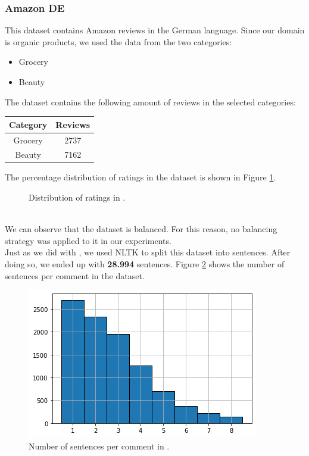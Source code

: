 \subsubsection{Amazon DE}
This dataset contains Amazon reviews in the German language. Since our domain is organic products, we used the data from the two categories:
\begin{itemize}
  \item Grocery
  \item Beauty
\end{itemize}
The dataset contains the following amount of reviews in the selected categories:
\begin{center}
 \begin{tabular}{||c c||} 
 \hline
 Category & Reviews\\ [0.4ex] 
 \hline\hline
 Grocery & 2737\\ 
 \hline
 Beauty & 7162\\
 \hline
\end{tabular}
\end{center}
The percentage distribution of ratings in the dataset is shown in Figure \ref{amazon_de_pie_chart}.\\
\begin{figure}[h]
\centering
{}
\caption{Distribution of ratings in \dataDE.}
\label{amazon_de_pie_chart}
\end{figure}\\
We can observe that the dataset is balanced. For this reason, no balancing strategy was applied to it in our experiments.\\
Just as we did with \dataEN, we used NLTK to split this dataset into sentences. After doing so, we ended up with {\bf 28.994} sentences. Figure \ref{sentences_per_comment_amazon_de} shows the number of sentences per comment in the dataset.\\
\begin{figure}[h]
\centerline{\includegraphics[scale=.5]{images/sentences_per_comment_amazon_de.png}}
\caption{Number of sentences per comment in \dataDE.}
\label{sentences_per_comment_amazon_de}
\end{figure}
